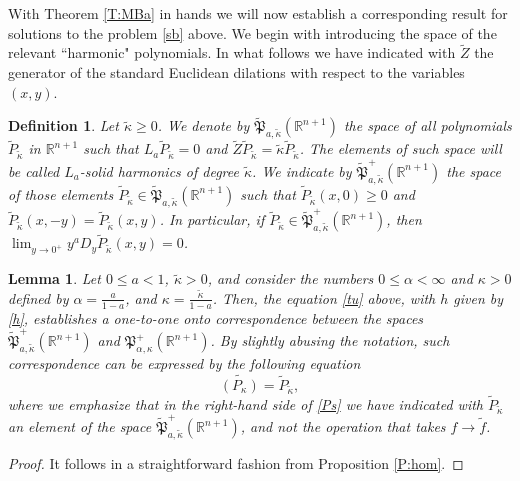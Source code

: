 \documentclass[11pt]{amsart}
\theoremstyle{plain}
\newtheorem{lemma}[thrm]{Lemma}
\newtheorem{dfn}[thrm]{Definition}
\numberwithin{equation}{section}
\begin{document}
With Theorem \ref{T:MBa} in hands we will now establish a corresponding result for solutions to the problem \eqref{sb} above. We begin with introducing the space of the relevant ``harmonic" polynomials. In what follows we have indicated with $\tilde Z$ the generator of the standard Euclidean dilations with respect to the variables $(x,y)$.

\begin{dfn}\label{D:shBa}
Let $\tilde \kappa\ge 0$. We denote by $\tilde{\mathfrak P}_{a,\tilde \kappa}({\mathbb R}^{n+1})$ the space of all polynomials $\tilde P_{\tilde \kappa}$ in ${\mathbb R}^{n+1}$ such that $L_a \tilde P_{\tilde \kappa} = 0$ and $\tilde Z \tilde P_{\tilde \kappa} = \tilde \kappa \tilde P_{\tilde \kappa}$. The elements of such space will be called $L_a$-\emph{solid harmonics} of degree $\tilde \kappa$. We indicate by $\tilde{\mathfrak P}^+_{a,\tilde \kappa}({\mathbb R}^{n+1})$  the space of those elements $\tilde P_{\tilde \kappa}\in \tilde{\mathfrak P}_{a,\tilde \kappa}({\mathbb R}^{n+1})$  such that $\tilde P_{\tilde \kappa}(x,0) \ge 0$ and $\tilde P_{\tilde \kappa}(x,-y) = \tilde P_{\tilde \kappa}(x,y)$. In particular, if $\tilde P_{\tilde \kappa}\in \tilde{\mathfrak P}^+_{a,\tilde \kappa}({\mathbb R}^{n+1})$, then $\lim_{y\to 0^+} y^aD_y \tilde P_{\tilde \kappa}(x,y) = 0$.
\end{dfn}

\begin{lemma}\label{L:iso}
Let $0 \le a<1$, $\tilde \kappa > 0$, and consider the numbers $0 \le \alpha <\infty$ and $\kappa >0$ defined by $\alpha = \frac{a}{1-a}$, and $\kappa = \frac{\tilde \kappa}{1-a}$. Then, the equation \eqref{tu} above, with $h$ given by \eqref{h}, establishes a one-to-one onto correspondence between the spaces $\tilde{\mathfrak P}^+_{a,\tilde \kappa}({\mathbb R}^{n+1})$ and $\mathfrak P^+_{\alpha,\kappa}({\mathbb R}^{n+1})$. By slightly abusing the notation, such correspondence can be expressed by the following equation
\begin{equation}\label{Ps}
\widetilde{(P_\kappa)} = \tilde P_{\tilde \kappa},
\end{equation}
where we emphasize that in the right-hand side of \eqref{Ps} we have indicated with $\tilde P_{\tilde \kappa}$ an element of the space $\tilde{\mathfrak P}^+_{a,\tilde \kappa}({\mathbb R}^{n+1})$, and not the operation that takes $f\to \tilde f$.
\end{lemma}

\begin{proof}
It follows in a straightforward fashion from Proposition \ref{P:hom}.

\end{proof}
\end{document}
